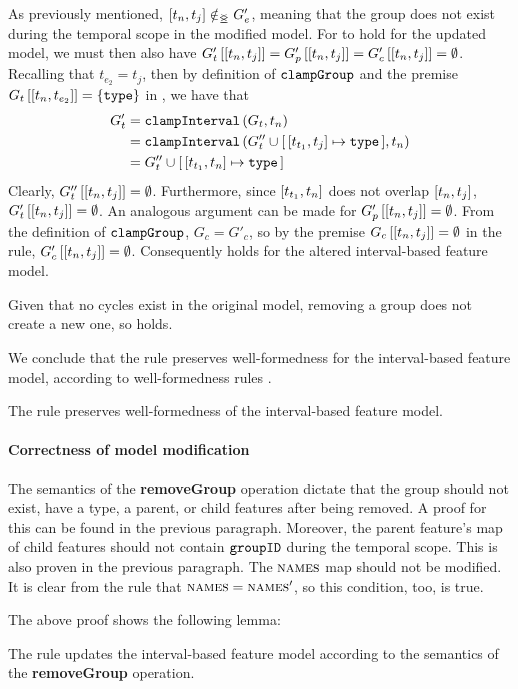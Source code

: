    As previously mentioned, $\interval{t_n}{t_j} \notinnr G'_e$, meaning that the group does not exist during the temporal scope in the modified model. For  to hold for the updated model, we must then also have $\lookup{G'_t}{\interval{t_n}{t_j}} = \lookup{G'_p}{\interval{t_n}{t_j}} = \lookup{G'_c}{\interval{t_n}{t_j}} = \emptyset$. Recalling that $t_{e_2} = t_j$, then by definition of $\texttt{clampGroup}$ and the premise $\lookup{G_t}{\interval{t_n}{t_{e_2}}} = \set{\var{type}}$ in , we have that
\begin{align*}
   G'_t &= \var{clampInterval}\left(G_t, t_n\right) \\
        &= \var{clampInterval}\left(G''_t \cup \intervalmapping{t_{t_1}}{t_j}{\var{type}}, t_n\right) \\
        &= G''_t \cup \intervalmapping{t_{t_1}}{t_n}{\var{type}}
\end{align*}
Clearly, $\lookup{G''_t}{\interval{t_n}{t_j}} = \emptyset$.  Furthermore, since $\interval{t_{t_1}}{t_n}$ does not overlap $\interval{t_n}{t_j}$, $\lookup{G'_t}{\interval{t_n}{t_j}} = \emptyset$. An analogous argument can be made for $\lookup{G'_p}{\interval{t_n}{t_j}} = \emptyset$. From the definition of $\texttt{clampGroup}$, $G_c = G'_c$, so by the premise $\lookup{G_c}{\interval{t_n}{t_j}} = \emptyset$ in the rule, $\lookup{G_c'}{\interval{t_n}{t_j}} = \emptyset$. Consequently  holds for the altered interval-based feature model.

Given that no cycles exist in the original model, removing a group does not create a new one, so  holds.

We conclude that the  rule preserves well-formedness for the interval-based feature model, according to well-formedness rules . 
\\

\begin{lemma}
   The  rule preserves well-formedness of the interval-based feature model.
   \label{lemma:remove-group-well-formed}
\end{lemma}

\paragraph{Correctness of model modification}
The semantics of the \textbf{removeGroup} operation dictate that the group should not exist, have a type, a parent, or child features after being removed. A proof for this can be found in the previous paragraph. Moreover, the parent feature's map of child features should not contain $\texttt{groupID}$ during the temporal scope. This is also proven in the previous paragraph. The $\textsc{names}{}$ map should not be modified. It is clear from the rule that $\textsc{names}{} = \textsc{names}{}'$, so this condition, too, is true.

The above proof shows the following lemma:
\\

\begin{lemma}
   The  rule updates the interval-based feature model according to the semantics of the \textbf{removeGroup} operation.
   \label{lemma:remove-group-mod}
\end{lemma}
